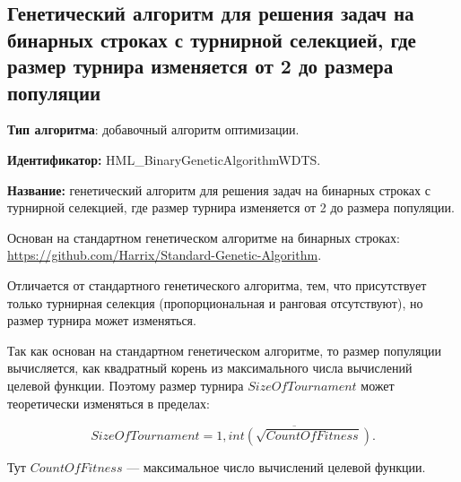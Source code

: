 \subsection{Генетический алгоритм для решения задач на бинарных строках с турнирной селекцией, где размер турнира изменяется от 2 до размера популяции}\label{HarrixOptimizationAlgorithms:HML_BinaryGeneticAlgorithmWDTS}

\textbf{Тип алгоритма}: добавочный алгоритм оптимизации.

\textbf{Идентификатор:} HML\_BinaryGeneticAlgorithmWDTS.

\textbf{Название:} генетический алгоритм для решения задач на бинарных строках с турнирной селекцией, где размер турнира изменяется от 2 до размера популяции.

Основан на стандартном генетическом алгоритме на бинарных строках:  \href{https://github.com/Harrix/Standard-Genetic-Algorithm}{https://github.com/Harrix/Standard-Genetic-Algorithm}. 

Отличается от стандартного генетического алгоритма, тем, что присутствует только турнирная селекция (пропорциональная и ранговая отсутствуют), но размер турнира может изменяться.

Так как основан на стандартном генетическом алгоритме, то размер популяции вычисляется, как квадратный корень из максимального числа вычислений целевой функции. Поэтому размер турнира $SizeOfTournament$ может теоретически  изменяться в пределах:

\begin{equation}
SizeOfTournament = \overline{1,int\left( \sqrt{CountOfFitness}\right) }.
\end{equation}

Тут $CountOfFitness$ --- максимальное число вычислений целевой функции.

